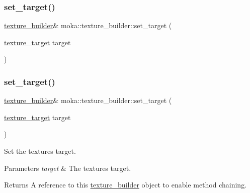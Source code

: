 \subsubsection{\texorpdfstring{set\_target()}{set\_target()}\hspace{0.1cm}{\footnotesize\ttfamily [1/2]}}
{\footnotesize\ttfamily \mbox{\hyperlink{classmoka_1_1texture__builder}{texture\+\_\+builder}}\& moka\+::texture\+\_\+builder\+::set\+\_\+target (\begin{DoxyParamCaption}\item[{\mbox{\hyperlink{namespacemoka_a259bf395c8f07bd8d13515efcb542623}{texture\+\_\+target}}}]{target }\end{DoxyParamCaption})}

\mbox{\label{classmoka_1_1texture__builder_ac4ce6bf2b9e2d92867a8134f235016df}} 
\subsubsection{\texorpdfstring{set\_target()}{set\_target()}\hspace{0.1cm}{\footnotesize\ttfamily [2/2]}}
{\footnotesize\ttfamily \mbox{\hyperlink{classmoka_1_1texture__builder}{texture\+\_\+builder}}\& moka\+::texture\+\_\+builder\+::set\+\_\+target (\begin{DoxyParamCaption}\item[{\mbox{\hyperlink{namespacemoka_a259bf395c8f07bd8d13515efcb542623}{texture\+\_\+target}}}]{target }\end{DoxyParamCaption})}



Set the texture\textquotesingle{}s target. 


\begin{DoxyParams}{Parameters}
{\em target} & The texture\textquotesingle{}s target. \\
\hline
\end{DoxyParams}
\begin{DoxyReturn}{Returns}
A reference to this \mbox{\hyperlink{classmoka_1_1texture__builder}{texture\+\_\+builder}} object to enable method chaining. 
\end{DoxyReturn}
\mbox{\label{classmoka_1_1texture__builder_ab1113f82648d8e5555f53e0fd65ba294}} 
